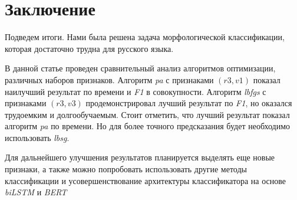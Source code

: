 \documentclass{csmathnotes}
\begin{document}
\section*{Заключение}
Подведем итоги. Нами была решена задача морфологической классификации, которая достаточно трудна для русского языка. 


В данной статье проведен сравнительный анализ алгоритмов оптимизации, различных наборов признаков. Алгоритм \emph{pa} с признаками $(r3, v1)$ показал наилучший результат по времени и \emph{F1}  в совокупности. Алгоритм \emph{lbfgs}  с признаками $(r3, v3)$ продемонстрировал лучший результат по \emph{F1}, но оказался трудоемким и долгообучаемым. Стоит отметить, что лучший результат показал алгоритм \emph{pa} по времени. Но для более точного предсказания будет необходимо использовать \emph{lbsg}.


Для дальнейшего улучшения результатов планируется выделять еще новые признаки, а также можно попробовать использовать другие методы классификации и усовершенствование архитектуры классификатора на основе \emph{biLSTM} и \emph{BERT}

\printbibliography
\end{document}
